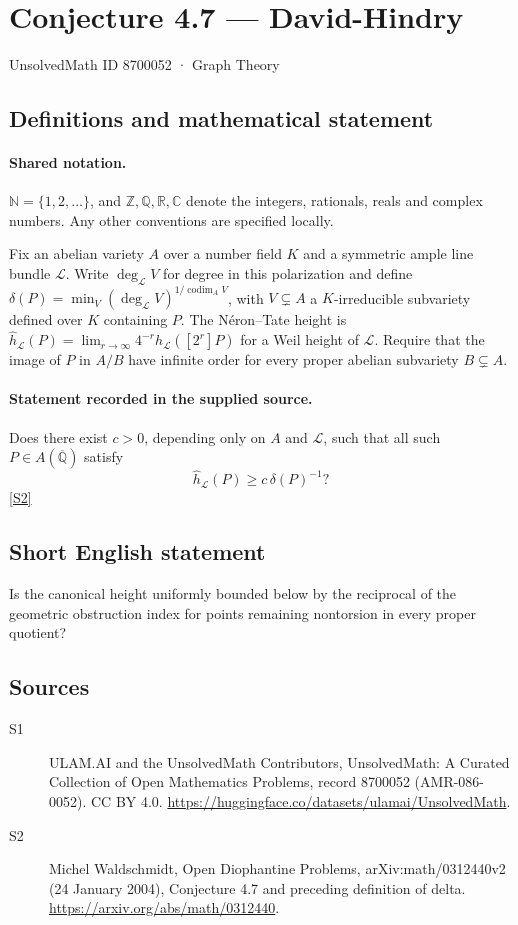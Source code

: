 \documentclass[11pt]{article}
\newcommand{\sref}[2]{\hyperlink{source:#1:#2}{[S#2]}}
\begin{document}
\setcounter{section}{8700051}
\section{Conjecture 4.7 — David-Hindry}\label{8700052}
{\small\sffamily UnsolvedMath ID 8700052 · Graph Theory}
\subsection{Definitions and mathematical statement}

\paragraph{Shared notation.}$\mathbb N=\{1,2,\ldots\}$, and $\mathbb Z,\mathbb Q,\mathbb R,\mathbb C$ denote the integers, rationals, reals and complex numbers. Any other conventions are specified locally.


Fix an abelian variety $A$ over a number field $K$ and a symmetric ample line bundle $\mathcal L$. Write $\deg_{\mathcal L}V$ for degree in this polarization and define $\delta(P)=\min_V(\deg_{\mathcal L}V)^{1/\operatorname{codim}_A V}$, with $V\subsetneq A$ a $K$-irreducible subvariety defined over $K$ containing $P$. The N\'eron--Tate height is $\widehat h_{\mathcal L}(P)=\lim_{r\to\infty}4^{-r}h_{\mathcal L}([2^r]P)$ for a Weil height of $\mathcal L$. Require that the image of $P$ in $A/B$ have infinite order for every proper abelian subvariety $B\subsetneq A$.
\paragraph{Statement recorded in the supplied source.}
Does there exist $c>0$, depending only on $A$ and $\mathcal L$, such that all such $P\in A(\overline{\mathbb Q})$ satisfy \[\widehat h_{\mathcal L}(P)\ge c\,\delta(P)^{-1}?\] \sref{8700052}{2}
\subsection{Short English statement}
Is the canonical height uniformly bounded below by the reciprocal of the geometric obstruction index for points remaining nontorsion in every proper quotient?
\subsection{Sources}
\begin{description}
\item[\hypertarget{source:8700052:1}{S1}] ULAM.AI and the UnsolvedMath Contributors, UnsolvedMath: A Curated Collection of Open Mathematics Problems, record 8700052 (AMR-086-0052). CC BY 4.0. \url{https://huggingface.co/datasets/ulamai/UnsolvedMath}.
\item[\hypertarget{source:8700052:2}{S2}] Michel Waldschmidt, Open Diophantine Problems, arXiv:math/0312440v2 (24 January 2004), Conjecture 4.7 and preceding definition of delta. \url{https://arxiv.org/abs/math/0312440}.
\end{description}
\label{end:8700052}
\end{document}
